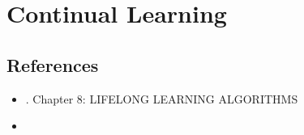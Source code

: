 \chapter{Continual Learning}


\section{References}
\begin{itemize}
	\item {}. Chapter 8: LIFELONG LEARNING ALGORITHMS
	\item {}
\end{itemize}